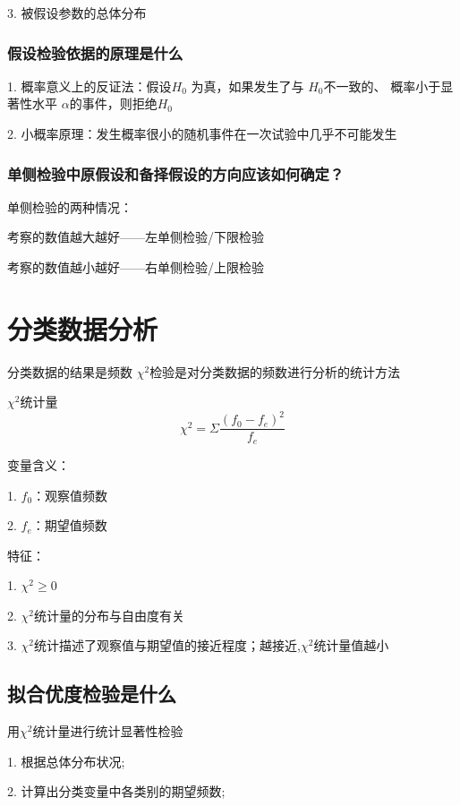 \documentclass[UTF8,10pt]{book}
\begin{document}
{    3. 被假设参数的总体分布


    \subsection{假设检验依据的原理是什么}	
    1. 概率意义上的反证法：假设$ H_0 $ 为真，如果发生了与 $ H_0 $不一致的、
    概率小于显著性水平 $ \alpha $的事件，则拒绝$ H_0 $ 
    
    2. 小概率原理：发生概率很小的随机事件在一次试验中几乎不可能发生

    \subsection{单侧检验中原假设和备择假设的方向应该如何确定？}
    单侧检验的两种情况： 
    
    考察的数值越大越好——左单侧检验/下限检验 
    
    考察的数值越小越好——右单侧检验/上限检验
}






\clearpage







\chapter{分类数据分析}


分类数据的结果是频数 $\chi^2$检验是对分类数据的频数进行分析的统计方法		

$\chi^2$统计量	$$\chi^2 = \Sigma \frac{(f_0-f_e)^2}{f_e}$$ 

变量含义： 

1. $f_0$：观察值频数 

2. $f_e$：期望值频数 

特征： 

1. $\chi^2 \geq 0$ 

2. $\chi^2$统计量的分布与自由度有关 

3. $\chi^2$统计描述了观察值与期望值的接近程度；越接近,$\chi^2$统计量值越小	

\section{拟合优度检验是什么}	
用$\chi^2$统计量进行统计显著性检验 

1. 根据总体分布状况; 

2. 计算出分类变量中各类别的期望频数; 
\end{document}
